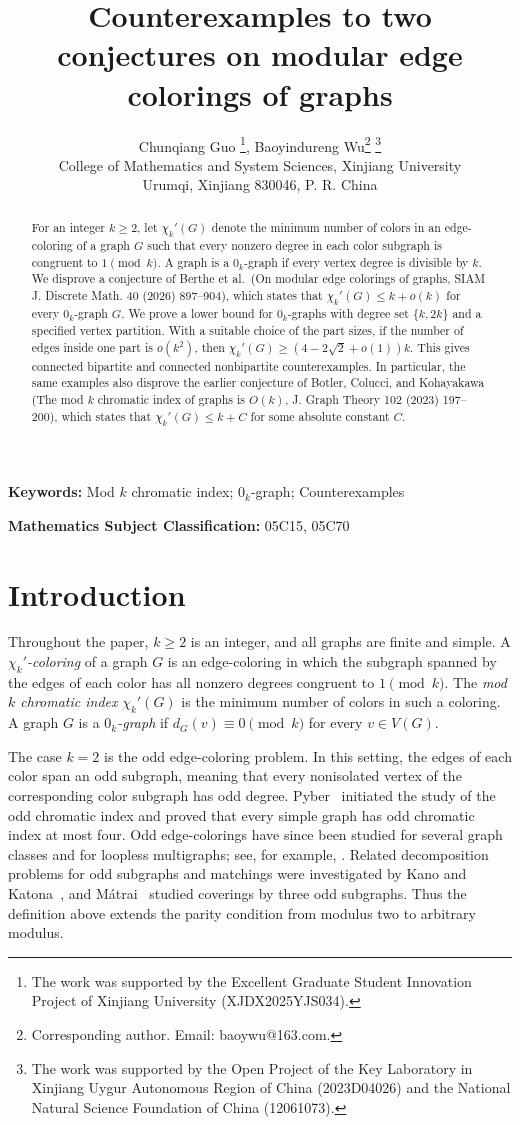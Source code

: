 \documentclass[11pt]{article}
\title{Counterexamples to two conjectures on modular edge colorings of graphs}
\author{Chunqiang Guo
\thanks{The work was supported by the Excellent Graduate Student Innovation Project of Xinjiang University (XJDX2025YJS034).},
Baoyindureng Wu\footnote{Corresponding author. Email: baoywu@163.com.}
\thanks{The work was supported by the Open Project of the Key Laboratory in
Xinjiang Uygur Autonomous Region of China (2023D04026) and the National
Natural Science Foundation of China (12061073).}\\
\small College of Mathematics and System Sciences, Xinjiang University\\
\small Urumqi, Xinjiang 830046, P. R. China\\}
\date{}
\begin{document}
\maketitle

\begin{abstract}
For an integer $k\geq2$, let $\chi_k'(G)$ denote the minimum number of
colors in an edge-coloring of a graph $G$ such that every nonzero degree
in each color subgraph is congruent to $1\pmod{k}$. A graph is a
$0_k$-graph if every vertex degree is divisible by $k$. We disprove a
conjecture of Berthe et al.\ (On modular edge colorings of graphs, SIAM
J. Discrete Math. 40 (2026) 897--904), which states that
$\chi_k'(G)\leq k+o(k)$ for every $0_k$-graph $G$. We prove a lower
bound for $0_k$-graphs with degree set $\{k,2k\}$ and a specified vertex
partition. With a suitable choice of the part sizes, if the number of
edges inside one part is $o(k^2)$, then
$\chi_k'(G)\geq(4-2\sqrt2+o(1))k$. This gives connected bipartite and
connected nonbipartite counterexamples. In particular, the same examples
also disprove the earlier conjecture of Botler, Colucci, and Kohayakawa
(The mod $k$ chromatic index of graphs is $O(k)$, J. Graph Theory 102
(2023) 197--200), which states that $\chi_k'(G)\leq k+C$ for some
absolute constant $C$.
\end{abstract}

\medskip
\noindent\textbf{Keywords:}
Mod $k$ chromatic index; $0_k$-graph; Counterexamples

\medskip
\noindent\textbf{Mathematics Subject Classification:}
05C15, 05C70

\section{Introduction}\label{sec:introduction}

Throughout the paper, $k\geq2$ is an integer, and all graphs are finite
and simple. A \emph{$\chi_k'$-coloring} of a graph $G$ is an edge-coloring in
which the subgraph spanned by the edges of each color has all nonzero
degrees congruent to $1\pmod{k}$. The \emph{mod $k$ chromatic index}
$\chi_k'(G)$ is the minimum number of colors in such a coloring. A graph
$G$ is a \emph{$0_k$-graph} if $d_G(v)\equiv0\pmod{k}$ for every
$v\in V(G)$.

The case $k=2$ is the odd edge-coloring problem. In this setting, the
edges of each color span an odd subgraph, meaning that every nonisolated
vertex of the corresponding color subgraph has odd degree.
Pyber~\cite{Pyber1992} initiated the study of the odd chromatic index and
proved that every simple graph has odd chromatic index at most four. Odd
edge-colorings have since been studied for several graph classes and for
loopless multigraphs; see, for example,
\cite{LuzarPetrusevskiSkrekovski2015,AtanasovPetrusevskiSkrekovski2016,
Petrusevski2018}. Related decomposition problems for odd subgraphs and
matchings were investigated by Kano and Katona~\cite{KanoKatona2002},
and M\'atrai~\cite{Matrai2006} studied coverings by three odd subgraphs.
Thus the definition above extends the parity condition from modulus two
to arbitrary modulus.
\end{document}
